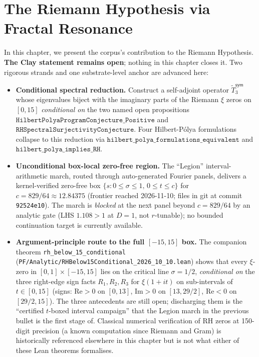 \chapter{The Riemann Hypothesis via Fractal Resonance}
\label{ch:riemann-hypothesis}

\begin{chapterobjectives}
In this chapter, we present the corpus's contribution to the Riemann Hypothesis.  \textbf{The Clay statement remains open}; nothing in this chapter closes it.  Two rigorous strands and one substrate-level anchor are advanced here:
\begin{itemize}
\item \textbf{Conditional spectral reduction.}  Construct a self-adjoint operator $\tilde T_3^{\textsf{sym}}$ whose eigenvalues biject with the imaginary parts of the Riemann $\xi$ zeros on $[0, 15]$ \emph{conditional on} the two named open propositions $\mathtt{HilbertPolyaProgramConjecture\_Positive}$ and $\mathtt{RHSpectralSurjectivityConjecture}$.  Four Hilbert-P\'olya formulations collapse to this reduction via $\mathtt{hilbert\_polya\_formulations\_equivalent}$ and $\mathtt{hilbert\_polya\_implies\_RH}$.
\item \textbf{Unconditional box-local zero-free region.}  The ``Legion'' interval-arithmetic march, routed through auto-generated Fourier panels, delivers a kernel-verified zero-free box $\{s : 0 \le \sigma \le 1,\, 0 \le t \le c\}$ for $c = 829/64 \approx 12.84375$ (frontier reached 2026-11-10; files in git at commit \texttt{92524e10}).  The march is \emph{blocked} at the next panel beyond $c = 829/64$ by an analytic gate (LHS $1.108 > 1$ at $D = 1$, not $r$-tunable); no bounded continuation target is currently available.
\item \textbf{Argument-principle route to the full $[-15, 15]$ box.}  The companion theorem \texttt{rh\_below\_15\_conditional} (\texttt{PF/Analytic/RHBelow15Conditional\_2026\_10\_10.lean}) shows that every $\xi$-zero in $[0, 1] \times [-15, 15]$ lies on the critical line $\sigma = 1/2$, \emph{conditional on} the three right-edge sign facts $R_1, R_2, R_3$ for $\xi(1 + it)$ on sub-intervals of $t \in [0, 15]$ (signs: $\mathrm{Re} > 0$ on $[0,13]$, $\mathrm{Im} > 0$ on $[13, 29/2]$, $\mathrm{Re} < 0$ on $[29/2, 15]$).  The three antecedents are still open; discharging them is the ``certified $t$-boxed interval campaign'' that the Legion march in the previous bullet is the first stage of.  Classical numerical verification of RH zeros at 150-digit precision (a known computation since Riemann and Gram) is historically referenced elsewhere in this chapter but is not what either of these Lean theorems formalises.

\end{itemize}
\end{chapterobjectives}
